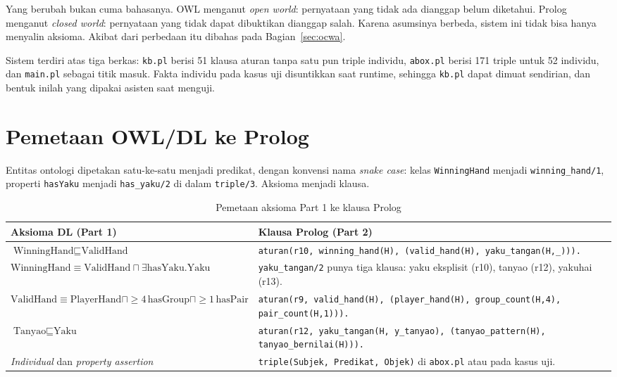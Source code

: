 \documentclass[11pt,a4paper]{article}
\newcommand{\code}[1]{\texttt{#1}}
\begin{document}
Yang berubah bukan cuma bahasanya. OWL menganut \textit{open world}: pernyataan yang tidak
ada dianggap belum diketahui. Prolog menganut \textit{closed world}: pernyataan yang tidak
dapat dibuktikan dianggap salah. Karena asumsinya berbeda, sistem ini tidak bisa hanya
menyalin aksioma. Akibat dari perbedaan itu dibahas pada Bagian~\ref{sec:ocwa}.

Sistem terdiri atas tiga berkas: \code{kb.pl} berisi 51 klausa aturan tanpa satu pun
triple individu, \code{abox.pl} berisi 171 triple untuk 52 individu, dan \code{main.pl}
sebagai titik masuk. Fakta individu pada kasus uji disuntikkan saat runtime, sehingga
\code{kb.pl} dapat dimuat sendirian, dan bentuk inilah yang dipakai asisten saat menguji.

\section{Pemetaan OWL/DL ke Prolog}

Entitas ontologi dipetakan satu-ke-satu menjadi predikat, dengan konvensi nama
\textit{snake case}: kelas \code{WinningHand} menjadi \code{winning_hand/1}, properti
\code{hasYaku} menjadi \code{has_yaku/2} di dalam \code{triple/3}. Aksioma menjadi klausa.

\begin{table}[h]
\centering\small
\caption{Pemetaan aksioma Part 1 ke klausa Prolog}
\label{tab:pemetaan}
\begin{tabular}{@{}p{6.3cm}p{8.2cm}@{}}
\toprule
Aksioma DL (Part 1) & Klausa Prolog (Part 2) \\
\midrule
$\text{WinningHand} \sqsubseteq \text{ValidHand}$ &
\code{aturan(r10, winning_hand(H), (valid_hand(H), yaku_tangan(H,_))).} \\
$\text{WinningHand} \equiv \text{ValidHand} \sqcap \exists\text{hasYaku}.\text{Yaku}$ &
\code{yaku_tangan/2} punya tiga klausa: yaku eksplisit (r10), tanyao (r12), yakuhai (r13). \\
$\text{ValidHand} \equiv \text{PlayerHand} \sqcap {\geq}4\,\text{hasGroup} \sqcap {\geq}1\,\text{hasPair}$ &
\code{aturan(r9, valid_hand(H), (player_hand(H), group_count(H,4), pair_count(H,1))).} \\
$\text{Tanyao} \sqsubseteq \text{Yaku}$ &
\code{aturan(r12, yaku_tangan(H, y_tanyao), (tanyao_pattern(H), tanyao_bernilai(H))).} \\
\textit{Individual} dan \textit{property assertion} &
\code{triple(Subjek, Predikat, Objek)} di \code{abox.pl} atau pada kasus uji. \\
\bottomrule
\end{tabular}
\end{table}
\end{document}

